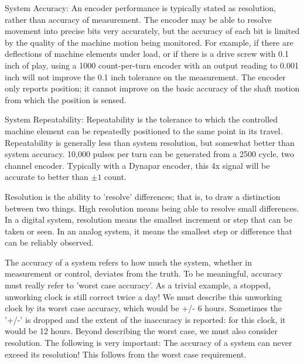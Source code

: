 System Accuracy: An encoder performance is typically stated as resolution, rather than accuracy of measurement. The encoder may be able to resolve movement into precise bits very accurately, but the accuracy of each bit is limited by the quality of the machine motion being monitored. For example, if there are deflections of machine elements under load, or if there is a drive screw with 0.1 inch of play, using a 1000 count-per-turn encoder with an output reading to 0.001 inch will not improve the 0.1 inch tolerance on the measurement. The encoder only reports
position; it cannot improve on the basic accuracy of the shaft motion from which the position is sensed.

System Repeatability: Repeatability is the tolerance to which the controlled machine element can be repeatedly positioned to the same point in its travel. Repeatability is generally less than system resolution, but somewhat better than system accuracy. 10,000 pulses per turn can be generated from a 2500 cycle, two channel encoder. Typically with a Dynapar encoder, this 4x signal will be accurate to better than $\pm 1$ count.

Resolution is the ability to 'resolve' differences; that is, to draw a distinction between two things. High resolution means being able to resolve small differences. In a digital system, resolution means the smallest increment or step that can be taken or seen. In an analog system, it means the smallest step or difference that can be reliably observed. 

The accuracy of a system refers to how much the system, whether in measurement or control, deviates from the truth. To be meaningful, accuracy must really refer to 'worst case accuracy'.
As a trivial example, a stopped, unworking clock is still correct twice a day! We must describe this unworking clock by its worst case accuracy, which would be +/- 6 hours. Sometimes the '+/-' is dropped and the extent of the inaccuracy is reported: for this clock, it would be 12 hours.
Beyond describing the worst case, we must also consider resolution. The following is very important:
The accuracy of a system can never exceed its resolution! This follows from the worst case requirement.


